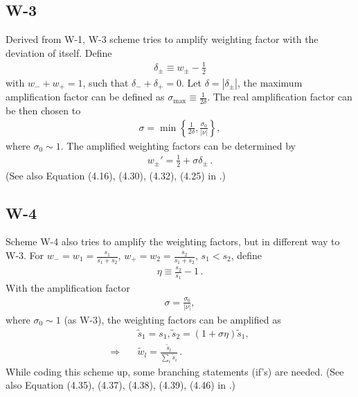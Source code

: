 \documentclass[letterpaper,12pt,dvips]{article}
\numberwithin{equation}{section}
\begin{document}
\subsection{W-3}

Derived from W-1, W-3 scheme tries to amplify weighting factor with the
deviation of itself.
Define
\begin{align}
  \delta_{\pm} \equiv w_{\pm} - \frac{1}{2} \label{e:W3_delta}
\end{align}
with $w_- + w_+ = 1$, such that $\delta_- + \delta_+ = 0$.
Let $\delta = |\delta_{\pm}|$, the maximum amplification factor can be 
defined as $\sigma_{\text{max}} \equiv \frac{1}{2\delta}$.
The real amplification factor can be then chosen to 
\begin{align}
  \sigma = \min\left\{\frac{1}{2\delta}, \frac{\sigma_0}{|\nu|}\right\}, 
    \label{e:W3_sigma}
\end{align}
where $\sigma_0\sim1$.
The amplified weighting factors can be determined by
\begin{align}
  w_{\pm}' = \frac{1}{2} + \sigma\delta_{\pm}\,. \label{e:W3_w}
\end{align}
(See also Equation (4.16), (4.30), (4.32), (4.25) in \cite{b:chang03}.)

\subsection{W-4}

Scheme W-4 also tries to amplify the weighting factors, but in different 
way to W-3.
For $w_- = w_1 = \frac{s_1}{s_1+s_2}$, $w_+ = w_2 = \frac{s_2}{s_1+s_2}$, 
$s_1<s_2$, define
\begin{align}
  \eta \equiv \frac{s_2}{s_1} - 1\,. \label{e:W4_eta}
\end{align}
With the amplification factor 
\begin{align}
  \sigma = \frac{\sigma_0}{|\nu|}, \label{e:W4_sigma}
\end{align}
where $\sigma_0 \sim 1$ (as W-3), the weighting factors can be amplified 
as
\begin{align}
  &\tilde{s}_1 = s_1, \tilde{s}_2 = (1+\sigma\eta)\tilde{s}_1, 
    \label{e:W4_s} \\
  \Rightarrow\quad &\tilde{w}_l = \frac{\tilde{s}_l}{\sum_i\tilde{s}_i}
    \label{e:W4_w} \,.
\end{align}
While coding this scheme up, some branching statements (if's) are 
needed.
(See also Equation (4.35), (4.37), (4.38), (4.39), (4.46) in 
\cite{b:chang03}.)
\end{document}
